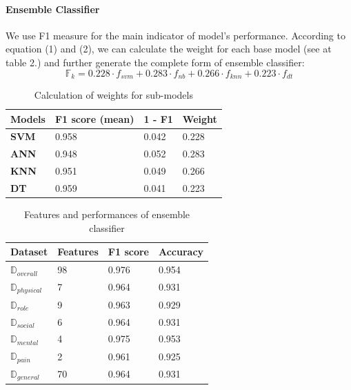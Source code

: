 \documentclass[runningheads]{llncs}
\begin{document}
\paragraph{Ensemble Classifier}
%
We use F1 measure for the main indicator of model's performance. According to equation (1) and (2), we can calculate the weight for each base model (see at table 2.) and further generate the complete form of ensemble classifier:
\begin{equation}
\mathbb{F}_{k} = 0.228 \cdot f_{svm} + 0.283 \cdot f_{nb} + 0.266 \cdot f_{knn} + 0.223 \cdot f_{dt}
\end{equation}
\begin{table}[h]
\begin{tabular}{|C{3cm}|C{3cm}|C{3cm}|C{3cm}|}
\hline
{} 
{\color[HTML]{333333} \textbf{Models}} & {\color[HTML]{333333} \textbf{F1 score (mean)}} & {\color[HTML]{333333} \textbf{1 - F1}} & {\color[HTML]{333333} \textbf{Weight}} \\ \hline
{} 
\textbf{SVM}& 0.958  & 0.042  & 0.228 \\ \hline
{} 
\textbf{ANN} & 0.948  & 0.052   & 0.283    \\ \hline
{} 
\textbf{KNN} & 0.951   & 0.049  & 0.266 \\ \hline
{} 
\textbf{DT}  & 0.959  & 0.041  & 0.223  \\ \hline
\end{tabular}
\caption{Calculation of weights for sub-models}
\label{weight}
\end{table}
%
%
\begin{table}[h]
\begin{tabular}{|C{3cm}|C{3cm}|C{3cm}|C{3cm}|}
\hline
{} 
{\color[HTML]{333333} \textbf{Dataset}} & {\color[HTML]{333333} \textbf{Features}} & {\color[HTML]{333333} \textbf{F1 score}} & {\color[HTML]{333333} \textbf{Accuracy}} \\ \hline
{} 
\textbf{$\mathbb{D}_{overall}$}& 98  & 0.976  & 0.954 \\ \hline
{} 
\textbf{$\mathbb{D}_{physical}$}& 7  & 0.964  & 0.931 \\ \hline
{} 
\textbf{$\mathbb{D}_{role}$} & 9  & 0.963   & 0.929    \\ \hline
{} 
\textbf{$\mathbb{D}_{social}$} & 6   & 0.964  & 0.931 \\ \hline
{} 
\textbf{$\mathbb{D}_{mental}$ }  & 4  & 0.975  & 0.953  \\ \hline
{} 
\textbf{$\mathbb{D}_{pain} $ }  & 2  & 0.961  & 0.925  \\ \hline
{} 
\textbf{$\mathbb{D}_{general}$ }  & 70  & 0.964  & 0.931  \\ \hline
\end{tabular}
\caption{Features and performances of ensemble classifier}
\label{subsets}
\end{table}
%
%
\end{document}
